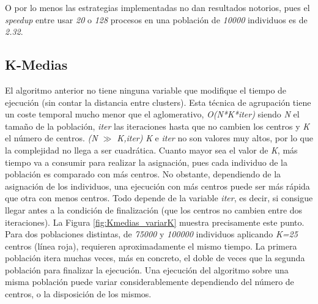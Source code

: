 					
			O por lo menos las estrategias implementadas no dan resultados notorios, pues el \textit{speedup} entre usar \textit{20} o \textit{128} procesos en una población de \textit{10000} individuos es de \textit{2.32}.
	
	
	
	\subsection{K-Medias}	

		El algoritmo anterior no tiene ninguna variable que modifique el tiempo de ejecución (sin contar la distancia entre clusters). Esta técnica de agrupación tiene un coste temporal mucho menor que el aglomerativo, \textit{O(N*K*iter)} siendo \textit{N} el tamaño de la población, \textit{iter} las iteraciones hasta que no cambien los centros y \textit{K} el número de centros. \textit{(N $\gg$ K,iter)} \textit{K} e \textit{iter} no son valores muy altos, por lo que la complejidad no llega a ser cuadrática. Cuanto mayor sea el valor de \textit{K}, más tiempo va a consumir para realizar la asignación, pues cada individuo de la población es comparado con más centros. No obstante, dependiendo de la asignación de los individuos,  una ejecución con más centros puede ser más rápida que otra con menos centros. Todo depende de la variable \textit{iter}, es decir, si consigue llegar antes a la condición de finalización (que los centros no cambien entre dos iteraciones). La Figura \ref{fig:Kmedias_variarK} muestra precisamente este punto. Para dos poblaciones distintas, de \textit{75000} y \textit{100000} individuos aplicando \textit{K=25} centros (línea roja), requieren aproximadamente el mismo tiempo. La primera población itera muchas veces, más en concreto, el doble de veces que la segunda población para finalizar la ejecución. Una ejecución del algoritmo sobre una misma población puede variar considerablemente dependiendo del número de centros, o la disposición de los mismos.
		
		
		

